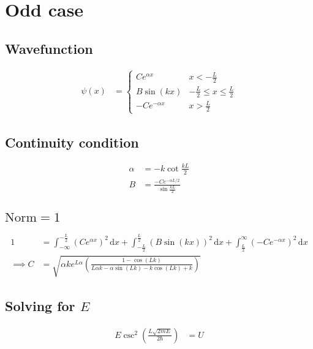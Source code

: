 \documentclass{article}
\newcommand{\dx}{\,\mathrm{d}x}
\begin{document}
\section{Odd case}
\subsection{Wavefunction}
\begin{align}
	\psi(x) & =\begin{cases}
		Ce^{\alpha x}   & x<-\frac{L}{2}                    \\
		B\sin(k x)      & -\frac{L}{2}\le x \le \frac{L}{2} \\
		-Ce^{-\alpha x} & x>\frac{L}{2}
	\end{cases}
\end{align}
\subsection{Continuity condition}
\begin{align}
	\alpha & =-k\cot\frac{kL}{2}                         \\
	B      & =\frac{-Ce^{-\alpha L/2}}{\sin\frac{kL}{2}}
\end{align}
\subsection{\(\textrm{Norm} = 1\)}
\begin{align}
	1          & =
	\int_{-\infty}^{-\frac{L}{2}}{(Ce^{\alpha x})}^2\dx+\int_{-\frac{L}{2}}^{\frac{L}{2}}{(B\sin(k x) )}^2\dx+\int_{\frac{L}{2}}^{\infty}{(-Ce^{-\alpha x})}^2\dx                       \\
	\implies C & =  \sqrt{\alpha k e^{L\alpha}\left(\frac{1-\cos{\left(L k \right)}}{L \alpha k - \alpha \sin{\left(L k \right)} - k \cos{\left(L k \right)} + k}\right)}
\end{align}
\subsection{Solving for \(E\)}
\begin{align}
	E\csc^2\left(\frac{L\sqrt{2mE}}{2\hbar}\right) & = U
\end{align}
\end{document}
